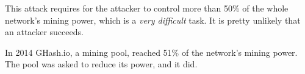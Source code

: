 This attack requires for the attacker to control more than 50\% of the whole network's mining power, which is a \textit{very difficult} task. It is pretty unlikely that an attacker succeeds.

In 2014 GHash.io, a mining pool, reached 51\% of the network's mining power. The pool was asked to reduce its power, and it did.\\